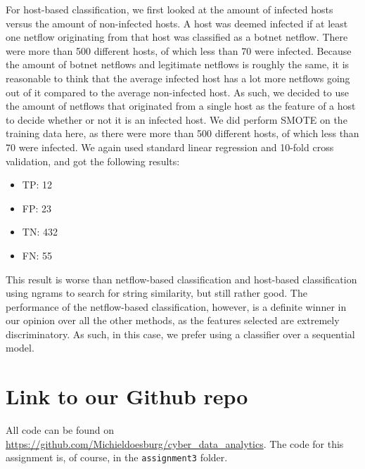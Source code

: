 \documentclass[]{article}
\begin{document}
For host-based classification, we first looked at the amount of infected hosts versus the amount of non-infected hosts. A host was deemed infected if at least one netflow originating from that host was classified as a botnet netflow. There were more than 500 different hosts, of which less than 70 were infected. Because the amount of botnet netflows and legitimate netflows is roughly the same, it is reasonable to think that the average infected host has a lot more netflows going out of it compared to the average non-infected host. As such, we decided to use the amount of netflows that originated from a single host as the feature of a host to decide whether or not it is an infected host. We did perform SMOTE on the training data here, as there were more than 500 different hosts, of which less than 70 were infected. We again used standard linear regression and 10-fold cross validation, and got the following results:
\begin{itemize}
	\item TP: 12
    \item FP: 23
    \item TN: 432
	\item FN: 55
\end{itemize}
This result is worse than netflow-based classification and host-based classification using ngrams to search for string similarity, but still rather good. The performance of the netflow-based classification, however, is a definite winner in our opinion over all the other methods, as the features selected are extremely discriminatory. As such, in this case, we prefer using a classifier over a sequential model.
\section{Link to our Github repo}
All code can be found on \url{https://github.com/Michieldoesburg/cyber_data_analytics}. The code for this assignment is, of course, in the \texttt{assignment3} folder.


\end{document}
